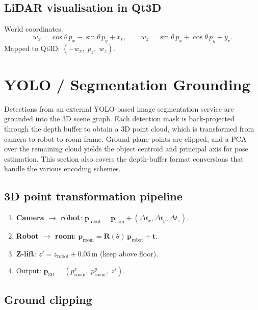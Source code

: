\documentclass[a4paper, 11pt]{article}
\newcommand{\vect}[1]{\bm{#1}}
\newcommand{\mat}[1]{\bm{#1}}
\begin{document}
\subsection{LiDAR visualisation in Qt3D}

World coordinates:
\begin{equation}
  w_x = \cos\theta\, p_x - \sin\theta\, p_y + x_r,
  \qquad
  w_z = \sin\theta\, p_x + \cos\theta\, p_y + y_r.
\end{equation}
Mapped to Qt3D: $(-w_x,\; p_z,\; w_z)$.

\section{YOLO / Segmentation Grounding}\label{sec:grounding}

Detections from an external YOLO-based image segmentation service are
grounded into the 3D scene graph.  Each detection mask is back-projected
through the depth buffer to obtain a 3D point cloud, which is
transformed from camera to robot to room frame.  Ground-plane points
are clipped, and a PCA over the remaining cloud yields the object
centroid and principal axis for pose estimation.  This section also
covers the depth-buffer format conversions that handle the various
encoding schemes.

\subsection{3D point transformation pipeline}

\begin{enumerate}
  \item \textbf{Camera $\to$ robot}:
    $\vect{p}_{\text{robot}}
    = \vect{p}_{\text{cam}} + (\Delta t_x, \Delta t_y, \Delta t_z)$.
  \item \textbf{Robot $\to$ room}:
    $\vect{p}_{\text{room}} = \mat{R}(\theta)\,\vect{p}_{\text{robot}} + \vect{t}$.
  \item \textbf{Z-lift}: $z' = z_{\text{robot}} + 0.05\,$m (keep above floor).
  \item Output: $\vect{p}_{3\text{D}} = (p_{\text{room}}^x,\; p_{\text{room}}^y,\; z')$.
\end{enumerate}

\subsection{Ground clipping}
\end{document}
